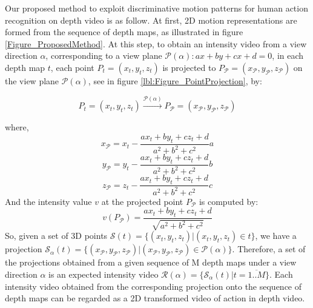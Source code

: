 \documentclass[final,3p,times,twocolumn]{elsarticle}
\begin{document}
Our proposed method to exploit discriminative motion patterns for human action recognition on depth video is as follow.
At first, 2D motion representations are formed from the sequence of depth maps, as illustrated in figure \ref{Figure_ProposedMethod}.
At this step, to obtain an intensity video from a view direction $\alpha$, corresponding to a view plane $\mathcal{P}(\alpha): ax + by + cx + d = 0$, in each depth map $t$, each point $P_t = (x_t,y_t,z_t)$ is projected to $P_\mathcal{P} = (x_\mathcal{P},y_\mathcal{P},z_\mathcal{P})$ on the view plane $\mathcal{P}(\alpha)$, see in figure \ref{lbl:Figure_PointProjection}, by:

\begin{equation}
	P_t = (x_t,y_t,z_t)\xrightarrow{\mathcal{P}(\alpha)}P_\mathcal{P} = (x_\mathcal{P},y_\mathcal{P},z_\mathcal{P})
\end{equation}

where,
\begin{equation}
	x_\mathcal{P} = x_t - \frac{ax_t + by_t + cz_t + d}{a^2 + b^2 + c^2}a
\end{equation}
\begin{equation}
	y_\mathcal{P} = y_t - \frac{ax_t + by_t + cz_t + d}{a^2 + b^2 + c^2}b
\end{equation}
\begin{equation}
	z_\mathcal{P} = z_t - \frac{ax_t + by_t + cz_t + d}{a^2 + b^2 + c^2}c
\end{equation}
And the intensity value $v$ at the projected point $P_\mathcal{P}$ is computed by:
\begin{equation}
	v(P_\mathcal{P}) = \frac{ax_t + by_t + cz_t + d}{\sqrt{a^2 + b^2 + c^2}}
\end{equation}
So, given a set of 3D points $\mathcal{S}(t) = \{(x_t,y_t,z_t)\vert(x_t,y_t,z_t) \in t\}$, we have a projection $\mathcal{S}_\alpha(t) = \{(x_\mathcal{P},y_\mathcal{P},z_\mathcal{P})\vert(x_\mathcal{P},y_\mathcal{P},z_\mathcal{P}) \in \mathcal{P}(\alpha)\}$. Therefore, a set of the projections obtained from a given sequence of M depth maps under a view direction $\alpha$ is an expected intensity video $\mathcal{R}(\alpha) = \{\mathcal{S}_\alpha(t) \vert t=\overline{1..M}\}$. Each intensity video obtained from the corresponding projection onto the sequence of depth maps can be regarded as a 2D transformed video of action in depth video.
\end{document}
